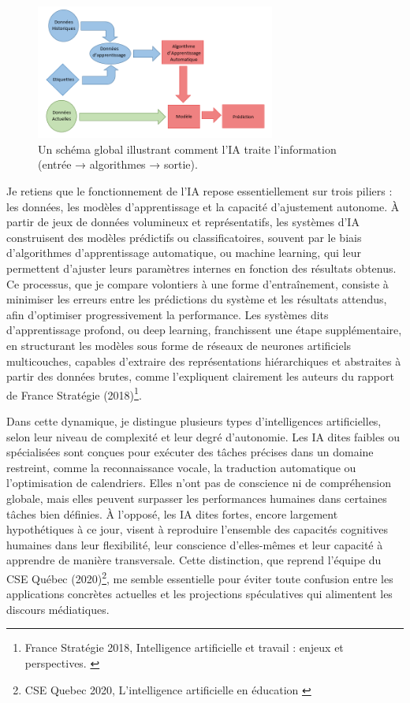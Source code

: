 \documentclass[11pt,a4paper]{report}
\begin{document}
\begin{figure}[h]
    \centering
    \includegraphics[width=0.7\textwidth]{images/2.1.1.png}
    \caption{Un schéma global illustrant comment l’IA traite l’information (entrée → algorithmes → sortie).}
    \label{fig:2.1.1}
\end{figure}

Je retiens que le fonctionnement de l’IA repose essentiellement sur trois piliers : les données, les modèles d’apprentissage et la capacité d’ajustement autonome. À partir de jeux de données volumineux et représentatifs, les systèmes d’IA construisent des modèles prédictifs ou classificatoires, souvent par le biais d’algorithmes d’apprentissage automatique, ou machine learning, qui leur permettent d’ajuster leurs paramètres internes en fonction des résultats obtenus. Ce processus, que je compare volontiers à une forme d’entraînement, consiste à minimiser les erreurs entre les prédictions du système et les résultats attendus, afin d’optimiser progressivement la performance. Les systèmes dits d’apprentissage profond, ou deep learning, franchissent une étape supplémentaire, en structurant les modèles sous forme de réseaux de neurones artificiels multicouches, capables d’extraire des représentations hiérarchiques et abstraites à partir des données brutes, comme l’expliquent clairement les auteurs du rapport de France Stratégie (2018)\footnote{France Stratégie 2018, Intelligence artificielle et travail : enjeux et perspectives. \cite{francestrategie}}.

Dans cette dynamique, je distingue plusieurs types d’intelligences artificielles, selon leur niveau de complexité et leur degré d’autonomie. Les IA dites faibles ou spécialisées sont conçues pour exécuter des tâches précises dans un domaine restreint, comme la reconnaissance vocale, la traduction automatique ou l’optimisation de calendriers. Elles n’ont pas de conscience ni de compréhension globale, mais elles peuvent surpasser les performances humaines dans certaines tâches bien définies. À l’opposé, les IA dites fortes, encore largement hypothétiques à ce jour, visent à reproduire l’ensemble des capacités cognitives humaines dans leur flexibilité, leur conscience d’elles-mêmes et leur capacité à apprendre de manière transversale. Cette distinction, que reprend l’équipe du CSE Québec (2020)\footnote{CSE Quebec 2020, L’intelligence artificielle en éducation \cite{hypotheses}}, me semble essentielle pour éviter toute confusion entre les applications concrètes actuelles et les projections spéculatives qui alimentent les discours médiatiques.
\end{document}

